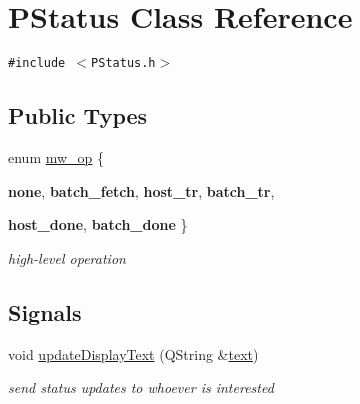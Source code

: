 \hypertarget{classPStatus}{
\section{PStatus Class Reference}
\label{classPStatus}
}
{\tt \#include $<$PStatus.h$>$}

\subsection*{Public Types}
\begin{CompactItemize}
\item 
enum \hyperlink{classPStatus_12bddf7bbeab6dfb53ae018c4f2939fd}{mw\_\-op} \{ \par
\textbf{none}, 
\textbf{batch\_\-fetch}, 
\textbf{host\_\-tr}, 
\textbf{batch\_\-tr}, 
\par
\textbf{host\_\-done}, 
\textbf{batch\_\-done}
 \}
\begin{CompactList}\small\item\em high-level operation \item\end{CompactList}\end{CompactItemize}
\subsection*{Signals}
\begin{CompactItemize}
\item 
\hypertarget{classPStatus_33221861aff7b12003b0ee313dfe1fe5}{
void \hyperlink{classPStatus_33221861aff7b12003b0ee313dfe1fe5}{updateDisplayText} (QString \&\hyperlink{classPStatus_56d3f6caa85a1a050cd41a099df6d931}{text})}
\label{classPStatus_33221861aff7b12003b0ee313dfe1fe5}

\begin{CompactList}\small\item\em send status updates to whoever is interested \item\end{CompactList}\end{CompactItemize}
